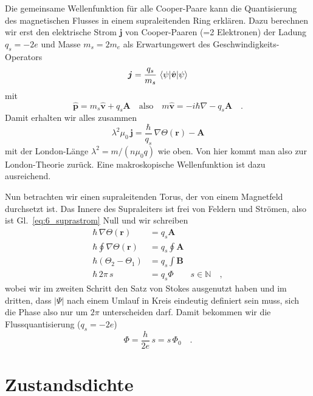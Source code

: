 Die gemeinsame Wellenfunktion für alle Cooper-Paare kann die Quantisierung des magnetischen Flusses in einem supraleitenden Ring erklären. Dazu berechnen wir erst den elektrische Strom $\bm{j}$ von Cooper-Paaren (=2 Elektronen) der Ladung $q_s = -2 e$ und Masse $m_s = 2 m_e$   als Erwartungswert des Geschwindigkeits-Operators
\begin{equation}
    \bm{j} = \frac{q_s}{m_s} \, \braket{\psi | \hat{\bm{v}} | \psi}
\end{equation}
 mit 
 \begin{equation}
   \hat{\bm{p}} = m_s \hat{\bm{v}} +  q_s \bm{A}   \quad \text{also} \quad m \hat{\bm{v}} = -i \hbar \nabla - q_s \bm{A}
   \quad .
 \end{equation}
 Damit erhalten wir alles zusammen
 \begin{equation}
  \lambda^2 \mu_0 \,  \bm{j} =   \frac{ \hbar }{q_s} \, \nabla \Theta (\bm{r}) - \bm{A} \label{eq:6_suprastrom}
 \end{equation}
 mit der London-Länge $\lambda^2 = m/ (n \mu_0 q)$ wie oben.
 Von hier kommt man also zur London-Theorie zurück. Eine makroskopische Wellenfunktion ist dazu ausreichend.

Nun betrachten wir einen supraleitenden Torus, der von einem Magnetfeld durchsetzt ist.  Das Innere des Supraleiters ist frei von Feldern und Strömen, also ist Gl.~\ref{eq:6_suprastrom} Null und wir schreiben
\begin{align}
     \hbar  \, \nabla \Theta (\bm{r})  &=  q_s \bm{A} \\
     \hbar \oint \nabla \Theta (\bm{r})& =  q_s \oint \bm{A}  \\
     \hbar (\Theta_2 - \Theta_1) & = q_s \int \bm{B} \\
   \hbar \, 2 \pi \, s & = q_s \Phi \qquad s \in \mathbb{N}  \quad ,
\end{align}
wobei wir im zweiten Schritt den Satz von Stokes ausgenutzt haben und im dritten, dass $|\Psi|$ nach einem Umlauf in Kreis eindeutig definiert sein muss, sich die Phase also nur um $2\pi$ unterscheiden darf. Damit bekommen wir die Flussquantisierung ($q_s = -2e$)
\begin{equation}
    \Phi = \frac{h}{2 e} \, s = s \, \Phi_0 \quad .
\end{equation}


\section*{Zustandsdichte}


